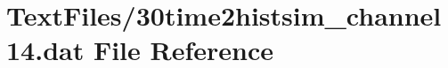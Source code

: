 \hypertarget{30time2histsim__channel14_8dat}{}\section{Text\+Files/30time2histsim\+\_\+channel14.dat File Reference}
\label{30time2histsim__channel14_8dat}
